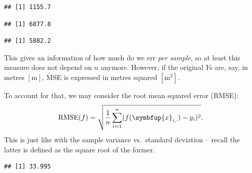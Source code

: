\documentclass[10pt,b5paper,krantz1]{krantz}
\newenvironment{Shaded}{\begin{snugshade}}{\end{snugshade}}
\newcommand{\DecValTok}[1]{\textcolor[rgb]{0.06,0.06,0.06}{#1}}
\newcommand{\KeywordTok}[1]{\textcolor[rgb]{0.27,0.27,0.27}{\textbf{#1}}}
\newcommand{\NormalTok}[1]{#1}
\newcommand{\OperatorTok}[1]{\textcolor[rgb]{0.43,0.43,0.43}{\textbf{#1}}}
\renewcommand{\mathbf}[1]{\symbfup{#1}}
\begin{document}
\begin{verbatim}
## [1] 1155.7
\end{verbatim}

\begin{Shaded}
\end{Shaded}

\begin{verbatim}
## [1] 6877.8
\end{verbatim}

\begin{Shaded}
\end{Shaded}

\begin{verbatim}
## [1] 5882.2
\end{verbatim}

This gives an information of how much do we err \emph{per sample},
so at least this measure does not depend on \(n\) anymore.
However, if the original \(Y\)s are, say, in metres \([\mathrm{m}]\),
MSE is expressed in metres squared \([\mathrm{m}^2]\).

To account for that, we may consider the root mean squared error (RMSE):
\[
 \mathrm{RMSE}(f) = \sqrt{\frac{1}{n} \sum_{i=1}^n (f(\mathbf{x}_{i,\cdot})-y_i)^2}.
\]
This is just like with the sample variance vs.~standard deviation --
recall the latter is defined as the square root of the former.

\begin{Shaded}
\end{Shaded}

\begin{verbatim}
## [1] 33.995
\end{verbatim}

\begin{Shaded}
\end{Shaded}
\end{document}
